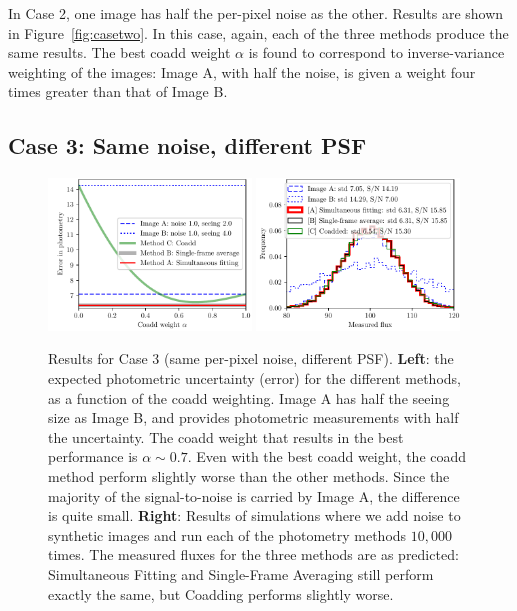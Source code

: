 \documentclass[a4paper,11pt]{article}
\begin{document}
In Case 2, one image has half the per-pixel noise as the other.
Results are shown in Figure~\ref{fig:casetwo}.  In this case, again,
each of the three methods produce the same results.  The best coadd
weight $\alpha$ is found to correspond to inverse-variance weighting
of the images: Image A, with half the noise, is given a weight four
times greater than that of Image B.

\newpage

\subsection*{Case 3: Same noise, different PSF}

\begin{figure}[b!]
  \begin{center}
    \includegraphics[width=0.48\textwidth]{coadd-04}
    \includegraphics[width=0.48\textwidth]{coadd-05}
  \end{center}
  \caption{Results for Case 3 (same per-pixel noise, different PSF).
    \textbf{Left}: the expected photometric uncertainty (error) for
    the different methods, as a function of the coadd weighting.
    Image A has half the seeing size as Image B, and provides
    photometric measurements with half the uncertainty.  The coadd
    weight that results in the best performance is $\alpha \sim 0.7$.
    Even with the best coadd weight, the coadd method perform slightly
    worse than the other methods.  Since the majority of the
    signal-to-noise is carried by Image A, the difference is quite
    small.
    \newline \textbf{Right}: Results of simulations where we add noise
    to synthetic images and run each of the photometry methods
    $10,000$ times.  The measured fluxes for the three methods are as
    predicted: Simultaneous Fitting and Single-Frame Averaging still
    perform exactly the same, but Coadding performs slightly worse.
    \label{fig:casethree}}
\end{figure}
\end{document}
